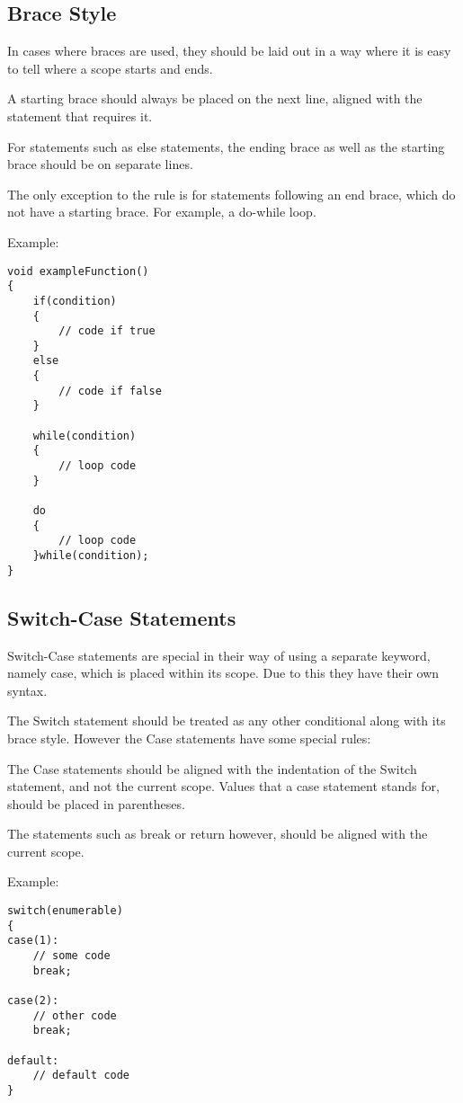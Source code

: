 \documentclass[12pt,article]{memoir}
\begin{document}
\newpage
\subsection{Brace Style}
In cases where braces are used, they should be laid out in a way where it is easy to tell where a scope starts and ends.\par
A starting brace should always be placed on the next line, aligned with the statement that requires it.\par
For statements such as else statements, the ending brace as well as the starting brace should be on separate lines.\par
The only exception to the rule is for statements following an end brace, which do not have a starting brace. For example, a do-while loop.\par
Example:
\begin{lstlisting}
void exampleFunction()
{
	if(condition)
	{
		// code if true
	}
	else
	{
		// code if false
	}

	while(condition)
	{
		// loop code
	}	
	
	do
	{
		// loop code
	}while(condition);
}
\end{lstlisting}

\newpage
\subsection{Switch-Case Statements}
Switch-Case statements are special in their way of using a separate keyword, namely case, which is placed within its scope. Due to this they have their own syntax.\par
The Switch statement should be treated as any other conditional along with its brace style. However the Case statements have some special rules:\par
The Case statements should be aligned with the indentation of the Switch statement, and not the current scope. Values that a case statement stands for, should be placed in parentheses.\par
The statements such as break or return however, should be aligned with the current scope.\par
Example:
\begin{lstlisting}
switch(enumerable)
{
case(1):
	// some code
	break;
	
case(2):
	// other code
	break;
	
default:
	// default code
}
\end{lstlisting}
\end{document}
